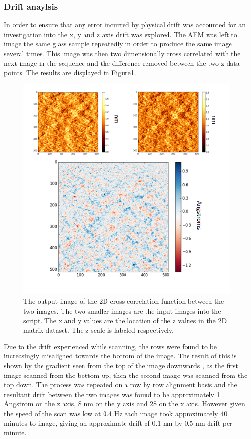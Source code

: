 \subsubsection{Drift anaylsis}

In order to ensure that any error incurred by physical drift was accounted for an investigation into the x, y and z axis drift was explored. The AFM was left to image the same glass sample repeatedly in order to produce the same image several times. This image was then two dimensionally cross correlated with the next image in the sequence and the difference removed between the two z data points. The results are displayed in Figure\ref{fig:CrossCor}.

\begin{figure}[h]     %
        \begin{center}
          \includegraphics[width=120mm]{chapter3/CrossCor.png}
\end{center}
\caption{The output image of the 2D cross correlation function between the two images. The two smaller images are the input images into the script. The x and y values are the location of the z values in the 2D matrix dataset. The z scale is labeled respectively.}
\label{fig:CrossCor}                 %
\end{figure}

Due to the drift experienced while scanning, the rows were found to be increasingly misaligned towards the bottom of the image. The result of this is shown by the gradient seen from the top of the image downwards , as the first image scanned from the bottom up, then the second image was scanned from the top down. The process was repeated on a row by row alignment basis and the resultant drift between the two images was found to be approximately 1 \AA{}ngstrom on the z axis, 8 nm on the y axis and 28 on the x axis. However given the speed of the scan was low at 0.4 Hz each image took approximately 40 minutes to image, giving an approximate drift of 0.1 nm by 0.5 nm drift per minute.

